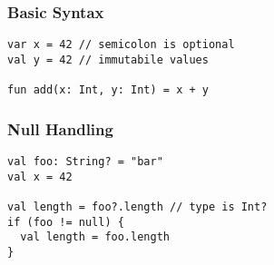 

\begin{frame}[fragile] \frametitle{Basic Syntax}
\begin{lstlisting}
var x = 42 // semicolon is optional
val y = 42 // immutabile values

fun add(x: Int, y: Int) = x + y
\end{lstlisting}
\end{frame}


\begin{frame}[fragile]
	\frametitle{Null Handling}
\begin{lstlisting}
val foo: String? = "bar"
val x = 42

val length = foo?.length // type is Int?
if (foo != null) {
  val length = foo.length
}
\end{lstlisting}
\end{frame}


